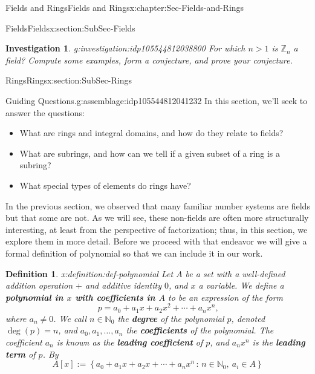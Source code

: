 \documentclass[oneside,10pt,]{book}
\newcommand{\terminology}[1]{\textbf{#1}}
\numberwithin{equation}{section}
\newcommand{\setof}[2]{{\left\{#1\,\colon\,#2\right\}}}
\def\Z{{\mathbb Z}}
\def\N{{\mathbb N}}
\newtheorem{definition}[theorem]{Definition}
\newtheorem{investigation}[theorem]{Investigation}
\begin{document}
\begin{chapterptx}{Fields and Rings}{}{Fields and Rings}{}{}{x:chapter:Sec-Fields-and-Rings}
\begin{sectionptx}{Fields}{}{Fields}{}{}{x:section:SubSec-Fields}
\begin{investigation}{}{g:investigation:idp105544812038800}%
For which \(n > 1\) is \(\Z_n\) a field? Compute some examples, form a conjecture, and prove your conjecture.%
\end{investigation}%
\end{sectionptx}
%
%
\typeout{************************************************}
\typeout{************************************************}
%
\begin{sectionptx}{Rings}{}{Rings}{}{}{x:section:SubSec-Rings}
\begin{assemblage}{Guiding Questions.}{g:assemblage:idp105544812041232}%
In this section, we'll seek to answer the questions: %
\begin{itemize}[label=\textbullet]
\item{}What are rings and integral domains, and how do they relate to fields?%
\item{}What are subrings, and how can we tell if a given subset of a ring is a subring?%
\item{}What special types of elements do rings have?%
\end{itemize}
%
\end{assemblage}
In the previous section, we observed that many familiar number systems are fields but that some are not. As we will see, these non-fields are often more structurally interesting, at least from the perspective of factorization; thus, in this section, we explore them in more detail. Before we proceed with that endeavor we will give a formal definition of polynomial so that we can include it in our work.%
\begin{definition}{}{x:definition:def-polynomial}%
Let \(A\) be a set with a well-defined addition operation \(+\) and additive identity \(0\), and \(x\) a variable. We define a \terminology{polynomial in \(x\) with coefficients in \(A\)} to be an expression of the form%
\begin{equation*}
p = a_0 + a_1 x + a_2 x^2 + \cdots + a_n x^n\text{,}
\end{equation*}
where \(a_n\ne 0\). We call \(n\in \N_0\) the \terminology{degree} of the polynomial \(p\), denoted \(\deg(p) = n\), and \(a_0,a_1,\ldots,
a_n\) the \terminology{coefficients} of the polynomial. The coefficient \(a_n\) is known as the \terminology{leading coefficient} of \(p\), and \(a_n x^n\) is the \terminology{leading term} of \(p\). By%
\begin{equation*}
A[x] := \setof{a_0 + a_1 x + a_2 x + \cdots + a_n x^n}{n\in \N_0, \ a_i\in A}

\end{equation*}
\end{definition}
\end{sectionptx}
\end{chapterptx}
\end{document}
